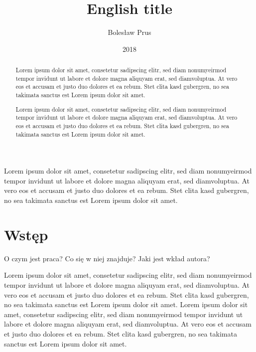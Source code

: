 \documentclass[pl]{minipw} %
\title{English title} %
\author{Bolesław Prus}
\date{2018}
\begin{document}
\sloppy






\setcounter{page}{1}


\begin{streszczenie}

Lorem ipsum dolor sit amet, consetetur sadipscing elitr, sed diam nonumyeirmod tempor invidunt ut labore et dolore magna aliquyam erat, sed diamvoluptua. At vero eos et accusam et justo duo dolores et ea rebum. Stet clita kasd gubergren, no sea takimata sanctus est Lorem ipsum dolor sit amet.\\


\end{streszczenie}


\begin{abstract}

Lorem ipsum dolor sit amet, consetetur sadipscing elitr, sed diam nonumyeirmod tempor invidunt ut labore et dolore magna aliquyam erat, sed diamvoluptua. At vero eos et accusam et justo duo dolores et ea rebum. Stet clita kasd gubergren, no sea takimata sanctus est Lorem ipsum dolor sit amet.

Lorem ipsum dolor sit amet, consetetur sadipscing elitr, sed diam nonumyeirmod tempor invidunt ut labore et dolore magna aliquyam erat, sed diamvoluptua. At vero eos et accusam et justo duo dolores et ea rebum. Stet clita kasd gubergren, no sea takimata sanctus est Lorem ipsum dolor sit amet.\\

\end{abstract}

\makestatement


\cleardoublepage
\tableofcontents


\cleardoublepage
\pagestyle{fancy}

\chapter*{Wstęp}

O czym jest praca? Co się w niej znajduje? Jaki jest wkład autora?

Lorem ipsum dolor sit amet, consetetur sadipscing elitr, sed diam nonumyeirmod tempor invidunt ut labore et dolore magna aliquyam erat, sed diamvoluptua. At vero eos et accusam et justo duo dolores et ea rebum. Stet clita kasd gubergren, no sea takimata sanctus est Lorem ipsum dolor sit amet. Lorem ipsum dolor sit amet, consetetur sadipscing elitr, sed diam nonumyeirmod tempor invidunt ut labore et dolore magna aliquyam erat, sed diamvoluptua. At vero eos et accusam et justo duo dolores et ea rebum. Stet clita kasd gubergren, no sea takimata sanctus est Lorem ipsum dolor sit amet.
\end{document}
